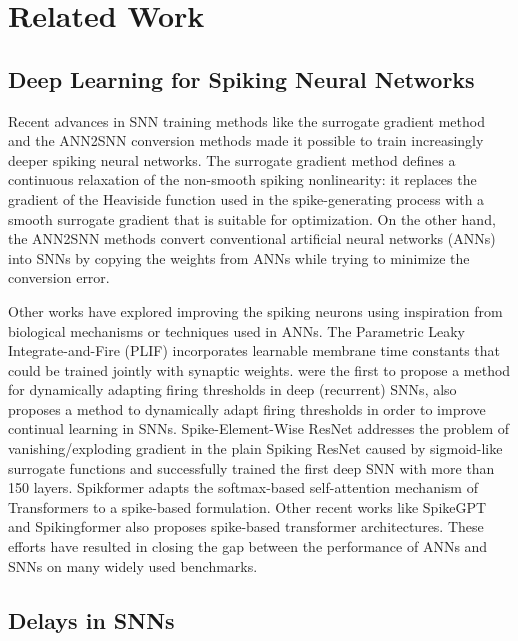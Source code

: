 \documentclass{article} \usepackage{iclr2024_conference,times}
\begin{document}
\section{Related Work}
\subsection{Deep Learning for Spiking Neural Networks}

Recent advances in SNN training methods like the surrogate gradient method \citep{neftci2018surrogate, slayer} and the ANN2SNN conversion methods \citep{ann2snn_1, ann2snn_2, ann2snn_3} made it possible to train increasingly deeper spiking neural networks. The surrogate gradient method defines a continuous relaxation of the non-smooth spiking nonlinearity: it replaces the gradient of the Heaviside function used in the spike-generating process with a smooth surrogate gradient that is suitable for optimization. On the other hand, the ANN2SNN methods convert conventional artificial neural networks (ANNs) into SNNs by copying the weights from ANNs while trying to minimize the conversion error. 

Other works have explored improving the spiking neurons using inspiration from biological mechanisms or techniques used in ANNs. The Parametric Leaky Integrate-and-Fire (PLIF) \citep{plif} incorporates learnable membrane time constants that could be trained jointly with synaptic weights. \citet{bellec2018} were the first to propose a method for dynamically adapting firing thresholds in deep (recurrent) SNNs, \citet{hammouamri2022mitigating} also proposes a method to dynamically adapt firing thresholds in order to improve continual learning in SNNs. Spike-Element-Wise ResNet \citep{sew} addresses the problem of vanishing/exploding gradient in the plain Spiking ResNet caused by sigmoid-like surrogate functions and successfully trained the first deep SNN with more than 150 layers. Spikformer \citep{spikformer} adapts the softmax-based self-attention mechanism of Transformers \citep{transformer} to a spike-based formulation. Other recent works like SpikeGPT \citep{spikegpt} and Spikingformer \citep{spikformer} also proposes spike-based transformer architectures. These efforts have resulted in closing the gap between the performance of ANNs and SNNs on many widely used benchmarks.

\subsection{Delays in SNNs}
\end{document}
